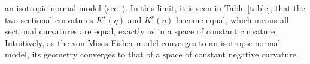 \documentclass{svmult}
\begin{document}
an isotropic normal model (see~\cite{jupp}). In this limit, it is seen in Table \ref{table}, that the two sectional curvatures $K^s(\eta)$ and $K^r(\eta)$ become equal, which means all sectional curvatures are equal, exactly as in a space of constant curvature. Intuitively, as the von Mises-Fisher model converges to an isotropic normal model, its geometry converges to that of a space of constant negative curvature. 










    



\end{document}
